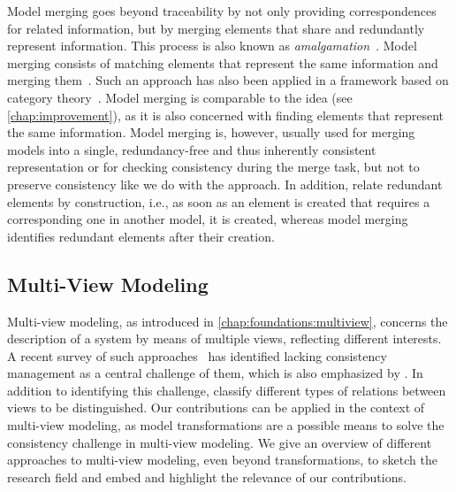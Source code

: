 Model merging goes beyond traceability by not only providing correspondences for related information, but by merging elements that share and redundantly represent information.
This process is also known as \emph{amalgamation}~\cite{koenig2017efficientConsistencyChecking-ECMFA}.
Model merging consists of matching elements that represent the same information and merging them~\cite{koenig2017efficientConsistencyChecking-ECMFA}.
Such an approach has also been applied in a framework based on category theory~\cite{diskin2010overlapsHeterogeneous-MDI}.
Model merging is comparable to the \commonalities idea (see \autoref{chap:improvement}), as it is also concerned with finding elements that represent the same information. 
Model merging is, however, usually used for merging models into a single, redundancy-free and thus inherently consistent representation or for checking consistency during the merge task, but not to preserve consistency like we do with the \commonalities approach.
In addition, \commonalities relate redundant elements by construction, i.e., as soon as an element is created that requires a corresponding one in another model, it is created, whereas model merging identifies redundant elements after their creation. %


\subsection{Multi-View Modeling}

Multi-view modeling, as introduced in \autoref{chap:foundations:multiview}, concerns the description of a system by means of multiple views, reflecting different interests.
A recent survey of such approaches~\cite{cicchetti2019multiview-SoSym} has identified lacking consistency management as a central challenge of them, which is also emphasized by \textcite{reineke2019ProblemMultiView-SoSym}.
In addition to identifying this challenge, \textcite{persson2013characterizationMultiView-EMSOFT} classify different types of relations between views to be distinguished.
Our contributions can be applied in the context of multi-view modeling, as model transformations are a possible means to solve the consistency challenge in multi-view modeling.
We give an overview of different approaches to multi-view modeling, even beyond transformations, to sketch the research field and embed and highlight the relevance of our contributions.

